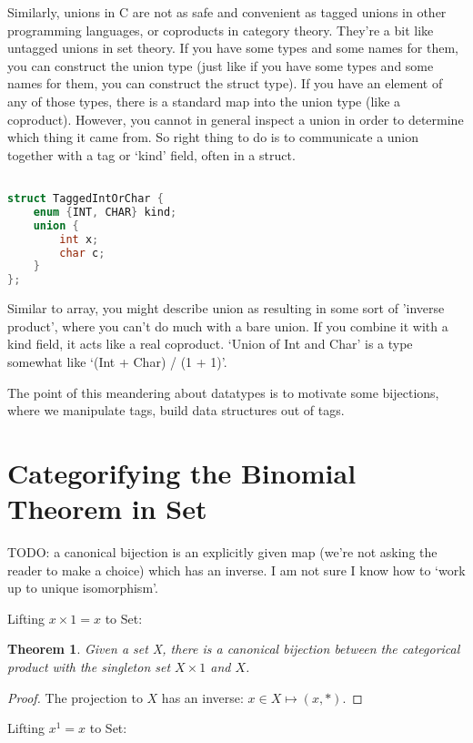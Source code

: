 \documentclass{proc-l}
\newtheorem{theorem}{Theorem}[section]
\theoremstyle{definition}
\theoremstyle{remark}
\numberwithin{equation}{section}
\begin{document}
Similarly, unions in C are not as safe and convenient as tagged unions in other programming languages,
or coproducts in category theory. They're a bit like untagged unions in set theory.
If you have some types and some names for them, you can construct the union type
(just like if you have some types and some names for them, you can construct the struct type).
If you have an element of any of those types, there is a standard map into the union type
(like a coproduct). However, you cannot in general inspect a union in order to determine which
thing it came from. So right thing to do is to communicate a union together with a tag or `kind' field,
often in a struct.

\begin{lstlisting}[language=C]

struct TaggedIntOrChar {
    enum {INT, CHAR} kind;
    union {
        int x;
        char c;
    }
};
\end{lstlisting}

Similar to array, you might describe union as resulting in some sort of 'inverse product',
where you can't do much with a bare union. If you combine it with a kind field,
it acts like a real coproduct. `Union of Int and Char' is a type somewhat 
like `(Int + Char) / (1 + 1)'.

The point of this meandering about datatypes is to motivate some bijections,
where we manipulate tags, build data structures out of tags.

\section{Categorifying the Binomial Theorem in Set}

TODO: a canonical bijection is an explicitly given map (we're not asking the reader to make a choice) which has an inverse.
I am not sure I know how to `work up to unique isomorphism'.

Lifting \(x \times 1 = x\) to Set:

\begin{theorem}
Given a set X, there is a canonical bijection between the categorical product with the singleton set \(X \times 1\) and \(X\).
\end{theorem}

\begin{proof}
The projection to \(X\) has an inverse: \(x \in X \mapsto (x, *)\). 
\end{proof}

Lifting \(x^1 = x\) to Set:
\end{document}
